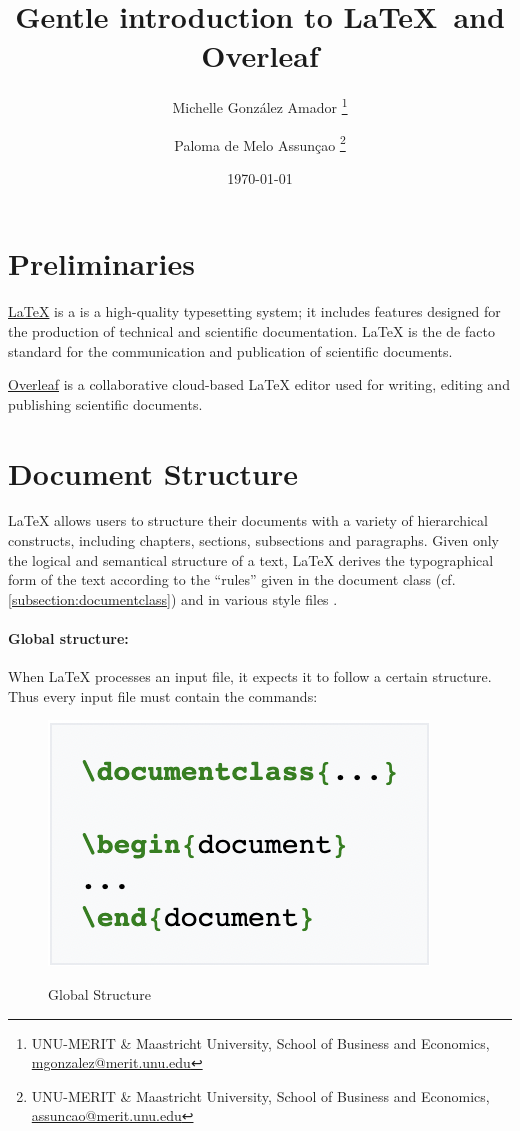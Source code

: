 \documentclass{article} %
\title{Gentle introduction to \LaTeX\ and Overleaf }
\author{Michelle González Amador%
    \footnote{UNU-MERIT \& Maastricht University, School of Business and Economics, \href{mailto:mgonzalez@merit.unu.edu}{mgonzalez@merit.unu.edu}}
\and
Paloma de Melo Assunçao%
    \footnote{UNU-MERIT \& Maastricht University, School of Business and Economics, \href{mailto:assuncao@merit.unu.edu}{assuncao@merit.unu.edu}}
}
\date{\today}
\begin{document}
\maketitle %

\section{Preliminaries}
\label{section:Preliminaries}

\hyperlink{https://www.latex-project.org/}{\LaTeX{}} is a is a high-quality typesetting system; it includes features designed for the production of technical and scientific documentation. \LaTeX{} is the de facto standard for the communication and publication of scientific documents.
\vspace{1.5em}

\noindent \hyperlink{https://www.overleaf.com/}{Overleaf} is a collaborative cloud-based \LaTeX{} editor used for writing, editing and publishing scientific documents.

\section{Document Structure}
\LaTeX{} allows users to structure their documents with a variety of hierarchical constructs, including chapters, sections, subsections and paragraphs. Given only the logical and semantical structure of a text, \LaTeX{} derives the typographical form of the text according to the “rules” given in the document class (cf. \cref{subsection:documentclass}) and in various style files \citep{baramidze2013latex}. 

\paragraph{Global structure:} When \LaTeX{} processes an input file, it expects it to follow a certain structure. Thus every input file must contain the commands:
\vspace{0.5cm} %

\begin{figure}[h]
    \centering
    \href{https://en.wikibooks.org/wiki/LaTeX/Document_Structure}{\includegraphics[scale=0.7,]{globalstructure.png}}
    \caption{Global Structure}
    \label{fig:globalstructure}
\end{figure}
\end{document}
